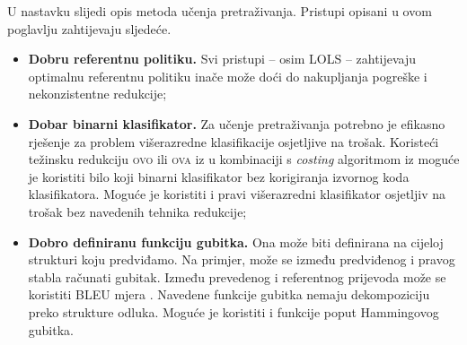 U nastavku slijedi opis metoda učenja pretraživanja. Pristupi opisani u ovom
poglavlju zahtijevaju sljedeće.

\begin{itemize}

  \item \textbf{Dobru referentnu politiku.} Svi pristupi -- osim \textsc{LOLS} --
  zahtijevaju optimalnu referentnu politiku inače može doći do nakupljanja
  pogreške  i nekonzistentne redukcije;

  \item \textbf{Dobar binarni klasifikator.} Za učenje pretraživanja potrebno je
  efikasno rješenje za problem višerazredne klasifikacije osjetljive na trošak.
  Koristeći težinsku redukciju \textsc{ovo} ili \textsc{ova}  iz \citep{beygelzimer2005error,
  beygelzimer2005weighted} u kombinaciji s \textit{costing} algoritmom iz
  \citep{zadrozny2003cost} moguće je koristiti bilo koji binarni klasifikator
  bez korigiranja izvornog koda klasifikatora. Moguće je koristiti i pravi
  višerazredni klasifikator osjetljiv na trošak bez navedenih tehnika redukcije;

  \item \textbf{Dobro definiranu funkciju gubitka.} Ona može biti definirana na
  cijeloj strukturi koju predviđamo. Na primjer, može se između predviđenog i
  pravog stabla računati  gubitak. Između prevedenog i
  referentnog prijevoda može se koristiti BLEU mjera . Navedene funkcije gubitka nemaju dekompoziciju preko
  strukture odluka. Moguće je koristiti i funkcije poput Hammingovog gubitka.

\end{itemize}
